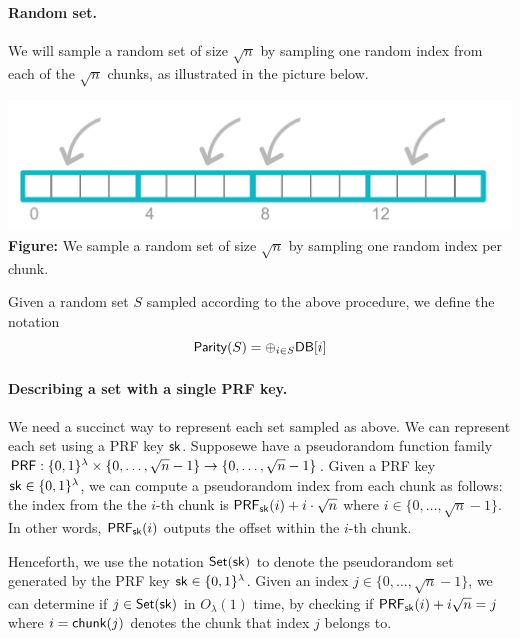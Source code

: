 \paragraph{Random set.}
We will sample a random set 
of size $\sqrt{n}$ by sampling one random index from
each of the $\sqrt{n}$ chunks, as illustrated in the picture below. 


\begin{center}
    \includegraphics[scale=0.6]{piano-sample}\\
{\bf Figure:} We sample a random set of size $\sqrt{n}$ by sampling one random index per chunk.
\end{center}

Given a random set $S$ sampled according to the above procedure,
we define the notation
\[
{\sf Parity}(S) = \oplus_{i \in S}{\sf DB}[i] 
\] 


\paragraph{Describing a set with a single PRF key.}
We need a succinct way to represent each set sampled as above.
We can represent each 
set using a PRF key ${\sf sk}$.
Supposewe have a 
pseudorandom function family 
${\sf PRF}:\{0,1\}^\lambda\times \{0,\dots,\sqrt{n}-1\}\to \{0,\dots,\sqrt{n}-1\}$. 
Given a PRF key ${\sf sk} \in \{0, 1\}^\lambda$, 
we can compute a pseudorandom 
index from each chunk as follows:
the index from the 
the $i$-th chunk is ${\sf PRF}_{\sf sk}(i)+i\cdot\sqrt{n}$ where $i \in \{0, \ldots, \sqrt{n}-1\}$. 
In other words,
${\sf PRF}_{\sf sk}(i)$ outputs the offset within the 
$i$-th chunk.

%

Henceforth, we use the notation ${\sf Set}({\sf sk})$ to denote
the pseudorandom set generated by the PRF key ${\sf sk} \in \{0, 1\}^\lambda$.
Given an index $j \in \{0,\dots,\sqrt{n}-1\}$,
we can determine if 
$j \in {\sf Set}({\sf sk})$ in $O_\lambda(1)$ time, 
by checking 
if ${\sf PRF}_{\sf sk}(i) + i \sqrt{n} = j$ where $i = {\sf chunk}(j)$ denotes
the chunk that index $j$ belongs to.



